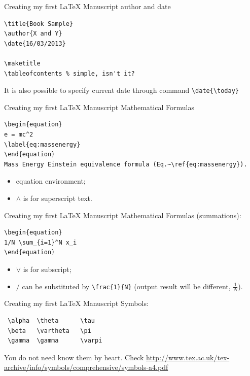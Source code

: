 \begin{frame}[fragile]{Creating my first \LaTeX{} Manuscript}
author and date
\scriptsize
\begin{verbatim}
\title{Book Sample}
\author{X and Y}
\date{16/03/2013}

\maketitle
\tableofcontents % simple, isn't it?
\end{verbatim}
\normalsize
It is also possible to specify current date through command \verb!\date{\today}!
\end{frame}


\begin{frame}[fragile]{Creating my first \LaTeX{} Manuscript}
Mathematical Formulas
\scriptsize
\begin{verbatim}
\begin{equation}
e = mc^2
\label{eq:massenergy}
\end{equation}
Mass Energy Einstein equivalence formula (Eq.~\ref{eq:massenergy}).
\end{verbatim}
\begin{itemize}
\item equation environment;
\item $\wedge$ is for superscript text.
\end{itemize}
\end{frame}


\begin{frame}[fragile]{Creating my first \LaTeX{} Manuscript}
Mathematical Formulas (summations):
\scriptsize
\begin{verbatim}
\begin{equation}
1/N \sum_{i=1}^N x_i
\end{equation}
\end{verbatim}
\begin{itemize}
\item $\vee$ is for subscript;
\item $/$ can be substituted by \verb!\frac{1}{N}! (output result will be different, $\frac{1}{N}$).
\end{itemize}
\end{frame}


\begin{frame}[fragile]{Creating my first \LaTeX{} Manuscript}
Symbols:
\begin{verbatim}
 \alpha  \theta      \tau          
 \beta   \vartheta   \pi     
 \gamma  \gamma      \varpi  
\end{verbatim}
You do not need know them by heart.
Check \url{http://www.tex.ac.uk/tex-archive/info/symbols/comprehensive/symbols-a4.pdf}
\end{frame}


